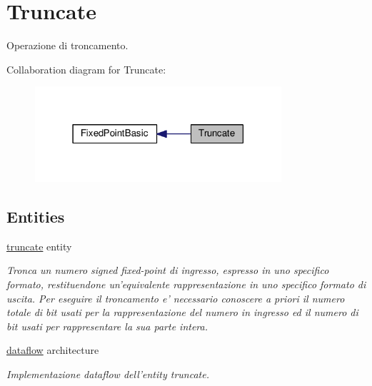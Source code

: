 \hypertarget{group___truncate}{\section{Truncate}
\label{group___truncate}
}


Operazione di troncamento.  


Collaboration diagram for Truncate\+:
\nopagebreak
\begin{figure}[H]
\begin{center}
\leavevmode
\includegraphics[width=259pt]{group___truncate}
\end{center}
\end{figure}
\subsection*{Entities}
\begin{DoxyCompactItemize}
\item 
\hyperlink{classtruncate}{truncate} entity
\begin{DoxyCompactList}\small\item\em Tronca un numero signed fixed-\/point di ingresso, espresso in uno specifico formato, restituendone un'equivalente rappresentazione in uno specifico formato di uscita. Per eseguire il troncamento e' necessario conoscere a priori il numero totale di bit usati per la rappresentazione del numero in ingresso ed il numero di bit usati per rappresentare la sua parte intera. \end{DoxyCompactList}\item 
\hyperlink{classtruncate_1_1dataflow}{dataflow} architecture
\begin{DoxyCompactList}\small\item\em Implementazione dataflow dell'entity truncate. \end{DoxyCompactList}\end{DoxyCompactItemize}
